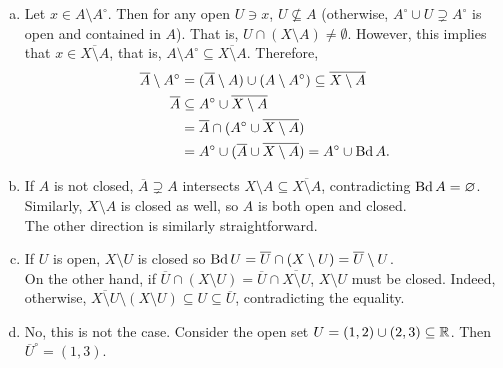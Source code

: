 \begin{solution*}
	\begin{enumerate}[(a)]
		\item Let $x\in A\setminus A^\circ$. Then for any open $U\ni x$, $U\not\subseteq A$ (otherwise, $A^\circ\cup U\supsetneq A^\circ$ is open and contained in $A$). That is, $U\cap (X\setminus A) \neq \emptyset$. However, this implies that $x\in \overline{X\setminus A}$, that is, $A\setminus A^\circ\subseteq \overline{X\setminus A}$. Therefore,
		\begin{align*}
			\overline{A}\setminus A^\circ &= (\overline{A}\setminus A) \cup (A\setminus A^\circ) \subseteq \overline{X\setminus A} \\
			\overline{A} &\subseteq A^\circ \cup \overline{X\setminus A} \\
				&= \overline{A} \cap (A^\circ \cup \overline{X\setminus A}) \\
				&= A^\circ \cup (\overline{A} \cup \overline{X\setminus A}) = A^\circ \cup \operatorname{Bd} A.
		\end{align*} 

		\item If $A$ is not closed, $\overline{A}\supsetneq A$ intersects $X\setminus A\subseteq \overline{X\setminus A}$, contradicting $\operatorname{Bd} A = \varnothing$. Similarly, $X\setminus A$ is closed as well, so $A$ is both open and closed.\\
		The other direction is similarly straightforward.

		\item If $U$ is open, $X\setminus U$ is closed so $\operatorname{Bd} U = \overline{U} \cap (X\setminus U) = \overline{U} \setminus U$.\\
		On the other hand, if $\overline{U}\cap (X\setminus U) = \overline{U}\cap \overline{X\setminus U}$, $X\setminus U$ must be closed. Indeed, otherwise, $\overline{X\setminus U} \setminus (X\setminus U) \subseteq U \subseteq \overline{U}$, contradicting the equality.

		\item No, this is not the case. Consider the open set $U=(1,2)\cup(2,3)\subseteq\mathbb{R}$. Then $\overline{U}^\circ=(1,3)$.
	\end{enumerate}
\end{solution*}

